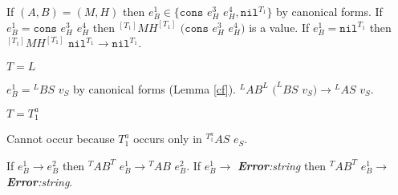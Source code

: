 \begin{case}
\begin{subcase}
If $(A,B)=(M,H)$ then $e_{B}^{1}\in\lbrace\mathtt{cons}$ $e_{H}^{3}$ $e_{H}^{4},\mathtt{nil}^{T_{1}}\rbrace$ by canonical forms.  If $e_{B}^{1}=\mathtt{cons}$ $e_{H}^{3}$ $e_{H}^{4}$ then $^{[T_{1}]}MH^{[T_{1}]}$ $(\mathtt{cons}$ $e_{H}^{3}$ $e_{H}^{4})$ is a value.  If $e_{B}^{1}=\mathtt{nil}^{T_{1}}$ then $^{[T_{1}]}MH^{[T_{1}]}$ $\mathtt{nil}^{T_{1}}\rightarrow\mathtt{nil}^{T_{1}}$.
\end{subcase}
\begin{subcase}
$T=L$

$e_{B}^{1}={^{L}B}S$ $v_{S}$ by canonical forms (Lemma \ref{cf}).  $^{L}AB^{L}$ $(^{L}BS$ $v_{S})\rightarrow{^{L}A}S$ $v_{S}$.
\end{subcase}
\begin{subcase}
$T=T_{1}^{a}$

Cannot occur because $T_{1}^{a}$ occurs only in $^{T_{1}^{a}}AS$ $e_{S}$.
\end{subcase}
If $e_{B}^{1}\rightarrow e_{B}^{2}$ then $^{T}AB^{T}$ $e_{B}^{1}\rightarrow{^{T}A}B$ $e_{B}^{2}$.  If $e_{B}^{1}\rightarrow$ \emph{\textbf{Error}:\;string} then $^{T}AB^{T}$ $e_{B}^{1}\rightarrow$ \emph{\textbf{Error}:\;string}.
\end{case}